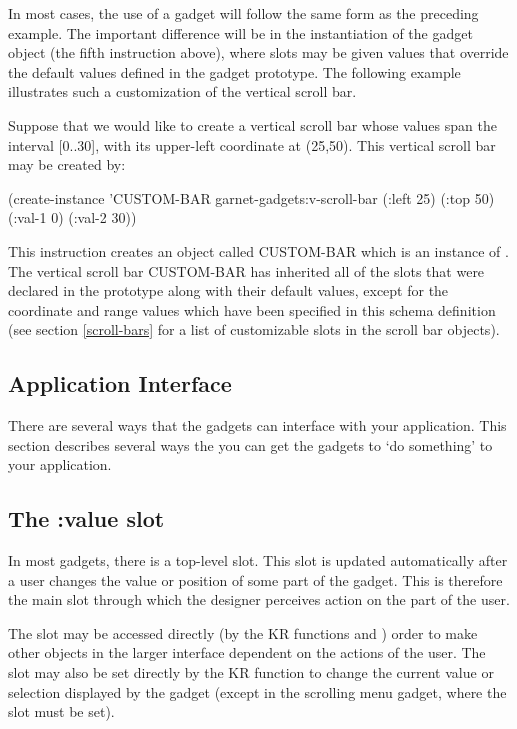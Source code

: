 In most cases, the use of a gadget will follow the same form as the
preceding example.  The important difference will be in the
instantiation of the gadget object (the fifth instruction above),
where slots may be given values that override the default values
defined in the gadget prototype.  The following example illustrates
such a customization of the vertical scroll bar.

Suppose that we would like to create a vertical scroll bar whose
values span the interval [0..30], with its upper-left coordinate at
(25,50).  This vertical scroll bar may be created by:
\begin{programexample}
(create-instance 'CUSTOM-BAR garnet-gadgets:v-scroll-bar
   (:left 25)
   (:top 50)
   (:val-1 0)
   (:val-2 30))
\end{programexample}
 This instruction creates an object called
CUSTOM-BAR which is an instance of .  The
vertical scroll bar CUSTOM-BAR has inherited all of the slots
that were declared in the  prototype along with their
default values, except for the coordinate and range values which have
been specified in this schema definition (see section
\ref{scroll-bars} for a list of customizable slots in the scroll bar
objects).


\begin{group}
\section{Application Interface}

There are several ways that the gadgets can interface with your
application.  This section describes several ways the you can get the
gadgets to `do something' to your application.

\subsection{The :value slot}
\label{value-slot}
In most gadgets, there is a top-level 
slot.  This slot is updated automatically after a user changes the
value or position of some part of the gadget.  This is therefore the
main slot through which the designer perceives action on the part of
the user.
\end{group}

The  slot may be accessed directly (by the KR functions
 and )
order to make other objects in the larger interface dependent on the
actions of the user.  The slot may also be set directly by the KR
function  to change the current value or selection
displayed by the gadget (except in the scrolling menu gadget, where
the  slot must be set).

